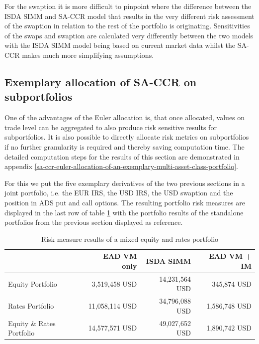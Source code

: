\documentclass[../Thesis_AHoecherl.tex]{subfiles}
\begin{document}
    For the swaption it is more difficult to pinpoint where the difference between the \gls{ISDA SIMM} and \gls{SA-CCR} model that results in the very different risk assessment of the swaption in relation to the rest of the portfolio is originating.
    Sensitivities of the swaps and swaption are calculated very differently between the two models with the \gls{ISDA SIMM} model being based on current market data whilst the \gls{SA-CCR} makes much more simplifying assumptions. 

    \subsection{Exemplary allocation of SA-CCR on subportfolios\label{sec:Exemplary allocation of SA-CCR on subportfolios}}

    One of the advantages of the Euler allocation is, that once allocated, values on trade level can be aggregated to also produce risk sensitive results for subportfolios. It is also possible to directly allocate risk metrics on subportfolios if no further granularity is required and thereby saving computation time. The detailed computation steps for the results of this section are demonstrated in appendix \ref{sa-ccr-euler-allocation-of-an-exemplary-multi-asset-class-portfolio}. 

    For this we put the five exemplary derivatives of the two previous sections in a joint portfolio, i.e. the EUR \gls{IRS}, the USD \gls{IRS}, the USD swaption and the position in ADS put and call options.
    The resulting portfolio risk measures are displayed in the last row of table \ref{tab:multiAssetResult} with the portfolio results of the standalone portfolios from the previous section displayed as reference.

    \begin{table}[htbp]
        \centering
        \begin{tabular}{l||r|r|r}
                & \gls{EAD} \gls{VM} only &\gls{ISDA SIMM} & \gls{EAD} \gls{VM} + \gls{IM} \\
                \toprule
        Equity Portfolio & 3,519,458 USD & 14,231,564 USD & 345,874 USD \\
        Rates Portfolio & 11,058,114 USD & 34,796,088 USD & 1,586,748 USD \\
        \midrule
        Equity \& Rates Portfolio & 14,577,571 USD & 49,027,652  USD & 1,890,742 USD \\
        \end{tabular}%
        \caption{Risk measure results of a mixed equity and rates portfolio}
        \label{tab:multiAssetResult}%
    \end{table}%
\end{document}
